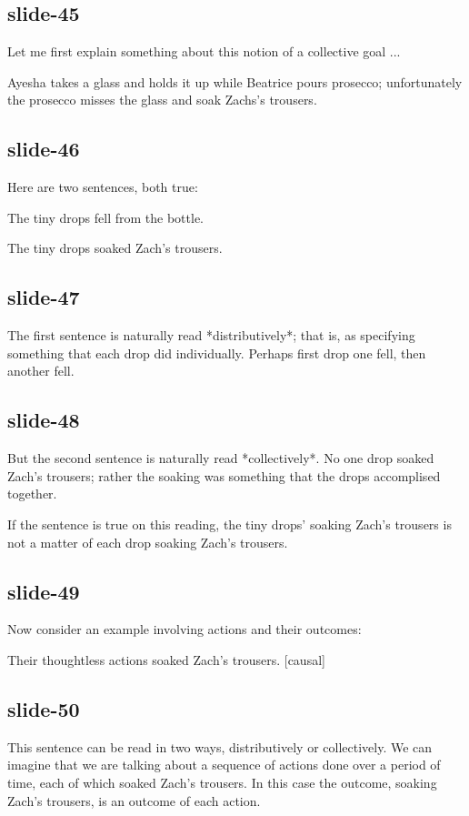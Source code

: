 \documentclass[12pt,\papersize]{extarticle}
\begin{document}
\subsection{slide-45}
Let me first explain something about this notion of a collective goal ...

Ayesha takes a glass and holds it up while Beatrice pours prosecco;
unfortunately the prosecco misses the glass and soak Zachs’s trousers.

\subsection{slide-46}
Here are two sentences, both true:

The tiny drops fell from the bottle.


The tiny drops soaked Zach’s trousers.


\subsection{slide-47}
The first sentence is naturally read *distributively*; that is, as specifying something
that each drop did individually.  Perhaps first drop one fell, then another fell.

\subsection{slide-48}
But the second sentence is naturally read *collectively*.
No one drop soaked Zach’s trousers; rather the soaking was something that the drops
accomplised together.

If the sentence is true on this reading, the tiny drops' soaking Zach’s trousers is not
a matter of each drop soaking Zach’s trousers.

\subsection{slide-49}
Now consider an example involving actions and their outcomes:

Their thoughtless actions soaked Zach’s trousers. [causal]

\subsection{slide-50}
This sentence can be read in two ways, distributively or collectively.
We can imagine that we are talking about a sequence of actions done
over a period of time, each of which soaked Zach’s trousers.
In this case the outcome, soaking Zach’s trousers, is an outcome of each action.
\end{document}
